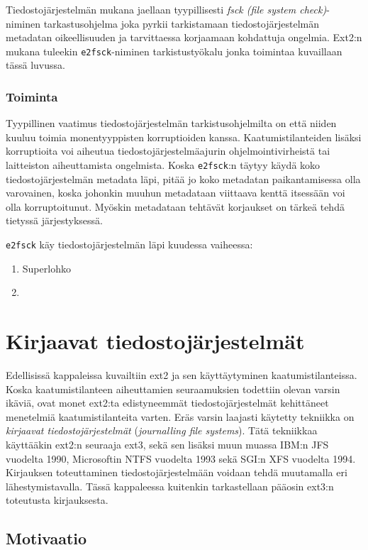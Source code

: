 Tiedostojärjestelmän mukana jaellaan tyypillisesti \emph{fsck (file system check)}-niminen tarkastusohjelma joka pyrkii tarkistamaan tiedostojärjestelmän metadatan oikeellisuuden ja tarvittaessa korjaamaan kohdattuja ongelmia.
Ext2:n mukana tuleekin \texttt{e2fsck}-niminen tarkistustyökalu jonka toimintaa kuvaillaan tässä luvussa.

\subsubsection{Toiminta}

Tyypillinen vaatimus tiedostojärjestelmän tarkistusohjelmilta on että niiden kuuluu toimia monentyyppisten korruptioiden kanssa.
Kaatumistilanteiden lisäksi korruptioita voi aiheutua tiedostojärjestelmäajurin ohjelmointivirheistä tai laitteiston aiheuttamista ongelmista.
Koska \texttt{e2fsck}:n täytyy käydä koko tiedostojärjestelmän metadata läpi,
pitää jo koko metadatan paikantamisessa olla varovainen,
koska johonkin muuhun metadataan viittaava kenttä itsessään voi olla korruptoitunut.
Myöskin metadataan tehtävät korjaukset on tärkeä tehdä tietyssä järjestyksessä.

\texttt{e2fsck} käy tiedostojärjestelmän läpi kuudessa vaiheessa:
\begin{enumerate}
    \item{Superlohko}
    \item{}
\end{enumerate}

\section{Kirjaavat tiedostojärjestelmät}
\label{ChapJournallingFs}
Edellisissä kappaleissa kuvailtiin ext2 ja sen käyttäytyminen kaatumistilanteissa.
Koska kaatumistilanteen aiheuttamien seuraamuksien todettiin olevan varsin ikäviä,
ovat monet ext2:ta edistyneemmät tiedostojärjestelmät kehittäneet menetelmiä kaatumistilanteita varten.
Eräs varsin laajasti käytetty tekniikka on \emph{kirjaavat tiedostojärjestelmät} (\emph{journalling file systems}).
Tätä tekniikkaa käyttääkin ext2:n seuraaja ext3, sekä sen lisäksi
muun muassa IBM:n JFS vuodelta 1990, Microsoftin NTFS vuodelta 1993 sekä SGI:n XFS vuodelta 1994.
Kirjauksen toteuttaminen tiedostojärjestelmään voidaan tehdä muutamalla eri lähestymistavalla.
Tässä kappaleessa kuitenkin tarkastellaan pääosin ext3:n toteutusta kirjauksesta.

\subsection{Motivaatio}

